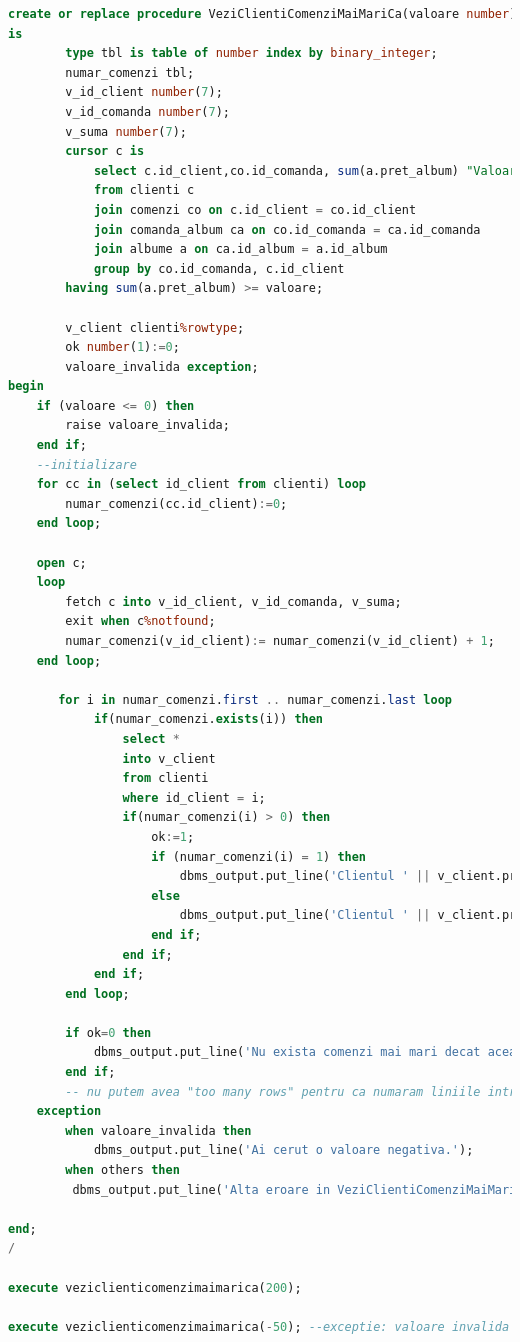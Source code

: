 \documentclass{article}
\begin{document}
\begin{lstlisting}[language=SQL, title=Cerinta 8]
create or replace procedure VeziClientiComenziMaiMariCa(valoare number)
is
        type tbl is table of number index by binary_integer;
        numar_comenzi tbl;
        v_id_client number(7);
        v_id_comanda number(7);
        v_suma number(7);
        cursor c is
            select c.id_client,co.id_comanda, sum(a.pret_album) "Valoare comanda"
            from clienti c 
            join comenzi co on c.id_client = co.id_client
            join comanda_album ca on co.id_comanda = ca.id_comanda
            join albume a on ca.id_album = a.id_album
            group by co.id_comanda, c.id_client
	    having sum(a.pret_album) >= valoare;
        
        v_client clienti%rowtype;
        ok number(1):=0;
        valoare_invalida exception;
begin
    if (valoare <= 0) then
        raise valoare_invalida;
    end if;
    --initializare
    for cc in (select id_client from clienti) loop
        numar_comenzi(cc.id_client):=0;
    end loop;
    
    open c;
    loop
        fetch c into v_id_client, v_id_comanda, v_suma;
        exit when c%notfound;
        numar_comenzi(v_id_client):= numar_comenzi(v_id_client) + 1;
    end loop;
    
       for i in numar_comenzi.first .. numar_comenzi.last loop
            if(numar_comenzi.exists(i)) then
                select *
                into v_client
                from clienti
                where id_client = i;
                if(numar_comenzi(i) > 0) then
                    ok:=1;
                    if (numar_comenzi(i) = 1) then
                        dbms_output.put_line('Clientul ' || v_client.prenume || ' ' || v_client.nume || ' a plasat o comanda cu valoare > '|| valoare ||' lei');
                    else
                        dbms_output.put_line('Clientul ' || v_client.prenume || ' ' || v_client.nume || ' a plasat ' || numar_comenzi(i) ||' comenzi cu valoare >  '|| valoare ||' lei');
                    end if;        
                end if;
            end if;
        end loop;
        
        if ok=0 then
            dbms_output.put_line('Nu exista comenzi mai mari decat aceasta valoare.');
        end if;
        -- nu putem avea "too many rows" pentru ca numaram liniile intr-un vector si afisam doar nr de linii
    exception
        when valoare_invalida then
            dbms_output.put_line('Ai cerut o valoare negativa.');
        when others then
         dbms_output.put_line('Alta eroare in VeziClientiComenziMaiMariCa');

end;
/

execute veziclienticomenzimaimarica(200);

execute veziclienticomenzimaimarica(-50); --exceptie: valoare invalida
\end{lstlisting}
\end{document}
